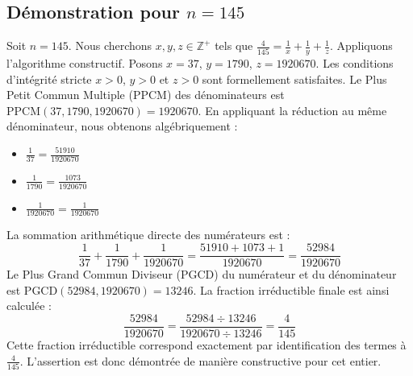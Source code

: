 \documentclass[11pt,a4paper]{article}
\begin{document}
\subsection{Démonstration pour $n = 145$}
Soit $n = 145$. Nous cherchons $x, y, z \in \mathbb{Z}^{+}$ tels que $\frac{4}{145} = \frac{1}{x} + \frac{1}{y} + \frac{1}{z}$.
Appliquons l'algorithme constructif. Posons $x = 37$, $y = 1790$, $z = 1920670$.
Les conditions d'intégrité stricte $x > 0$, $y > 0$ et $z > 0$ sont formellement satisfaites.
Le Plus Petit Commun Multiple (PPCM) des dénominateurs est $\text{PPCM}(37, 1790, 1920670) = 1920670$.
En appliquant la réduction au même dénominateur, nous obtenons algébriquement :
\begin{itemize}
    \item $\frac{1}{37} = \frac{51910}{1920670}$
    \item $\frac{1}{1790} = \frac{1073}{1920670}$
    \item $\frac{1}{1920670} = \frac{1}{1920670}$
\end{itemize}
La sommation arithmétique directe des numérateurs est :
$$ \frac{1}{37} + \frac{1}{1790} + \frac{1}{1920670} = \frac{51910 + 1073 + 1}{1920670} = \frac{52984}{1920670} $$
Le Plus Grand Commun Diviseur (PGCD) du numérateur et du dénominateur est $\text{PGCD}(52984, 1920670) = 13246$.
La fraction irréductible finale est ainsi calculée :
$$ \frac{52984}{1920670} = \frac{52984 \div 13246}{1920670 \div 13246} = \frac{4}{145} $$
Cette fraction irréductible correspond exactement par identification des termes à $\frac{4}{145}$. L'assertion est donc démontrée de manière constructive pour cet entier.
\end{document}
